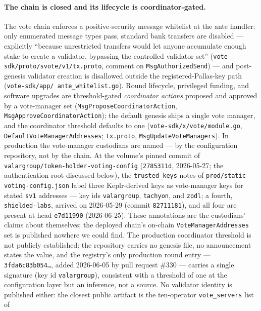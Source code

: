 \documentclass[11pt,a4paper]{article}
\theoremstyle{definition}
\begin{document}
\paragraph{The chain is closed and its lifecycle is coordinator-gated.}
The vote chain enforces a positive-security message whitelist at the ante
handler: only enumerated message types pass, standard bank transfers are
disabled --- explicitly ``because unrestricted transfers would let anyone
accumulate enough stake to create a validator, bypassing the controlled
validator set'' (\texttt{vote-sdk/proto/svote/v1/tx.proto}, comment on
\texttt{MsgAuthorizedSend}) --- and post-genesis validator creation is
disallowed outside the registered-Pallas-key path
(\texttt{vote-sdk/\allowbreak app/\allowbreak
ante\_whitelist.go}). Round lifecycle, privileged
funding, and software upgrades are threshold-gated \emph{coordinator
actions} proposed and approved by a vote-manager set
(\texttt{MsgPropose\allowbreak Coordinator\allowbreak Action},
\texttt{MsgApprove\allowbreak Coordinator\allowbreak Action});
the default genesis ships a single vote manager, and the coordinator
threshold defaults to one (\texttt{vote-sdk/x/vote/module.go},
\texttt{DefaultVoteManagerAddresses}; \texttt{tx.proto},
\texttt{MsgUpdateVoteManagers}).
In production the vote-manager custodians are named --- by the
configuration repository, not by the chain. At the volume's pinned commit
of \texttt{valargroup/token-holder-voting-config} (\texttt{2785311d},
2026-05-27; the authentication root discussed below), the
\texttt{trusted\_keys} notes of \texttt{prod/static-voting-config.json}
label three Keplr-derived keys as vote-manager keys for stated
\texttt{sv1} addresses --- key ids \texttt{valargroup}, \texttt{tachyon},
and \texttt{zodl}; a fourth, \texttt{shielded-labs}, arrived on 2026-05-29
(commit \texttt{82711181}), and all four are present at head
\texttt{e7d11990} (2026-06-25). These annotations are the custodians'
claims about themselves; the deployed chain's on-chain
\texttt{VoteManagerAddresses} set is published nowhere we could find. The
production coordinator threshold is not publicly established: the
repository carries no genesis file, no announcement states the value, and
the registry's only production round entry ---
\texttt{3fda6c83b054\ldots}, added 2026-06-05 by pull request \#330 ---
carries a single signature (key id \texttt{valargroup}), consistent with
a threshold of one at the configuration layer but an inference, not a
source. No validator identity is published either: the closest public
artifact is the ten-operator \texttt{vote\_servers} list of
\end{document}
